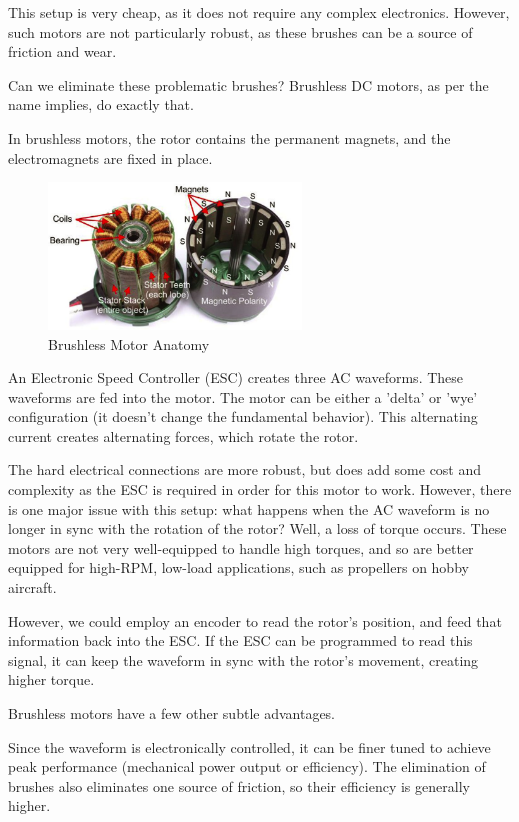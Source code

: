 \documentclass[10pt,letterpaper]{book}
\begin{document}
This setup is very cheap, as it does not require any complex electronics. However, such motors are not particularly robust, as these brushes can be a source of friction and wear.

Can we eliminate these problematic brushes? Brushless DC motors, as per the name implies, do exactly that.

In brushless motors, the rotor contains the permanent magnets, and the electromagnets are fixed in place.
\begin{figure}[H]\centering
\includegraphics[width=0.6\textwidth]{img_Mechatronics_Motors_brushless.png}
\caption{Brushless Motor Anatomy}
\end{figure}

An Electronic Speed Controller (ESC) creates three AC waveforms. These waveforms are fed into the motor. The motor can be either a 'delta' or 'wye' configuration (it doesn't change the fundamental behavior). This alternating current creates alternating forces, which rotate the rotor.

The hard electrical connections are more robust, but does add some cost and complexity as the ESC is required in order for this motor to work. However, there is one major issue with this setup: what happens when the AC waveform is no longer in sync with the rotation of the rotor? Well, a loss of torque occurs. These motors are not very well-equipped to handle high torques, and so are better equipped for high-RPM, low-load applications, such as propellers on hobby aircraft.

However, we could employ an encoder to read the rotor's position, and feed that information back into the ESC. If the ESC can be programmed to read this signal, it can keep the waveform in sync with the rotor's movement, creating higher torque.

Brushless motors have a few other subtle advantages.

Since the waveform is electronically controlled, it can be finer tuned to achieve peak performance (mechanical power output or efficiency). The elimination of brushes also eliminates one source of friction, so their efficiency is generally higher.
\end{document}

